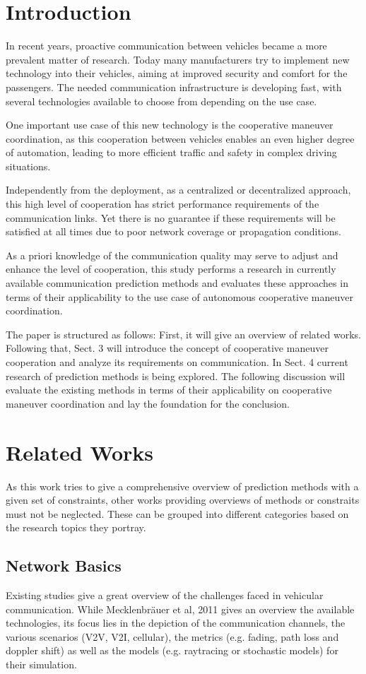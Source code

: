 \documentclass[conference]{IEEEtran}
\begin{document}
\section{Introduction}
\label{sec:introduction}
In recent years, proactive communication between vehicles became a more prevalent matter of research. Today many manufacturers try to implement new technology into their vehicles, aiming at  improved security and comfort for the passengers. The needed communication infrastructure is developing fast, with several technologies available to choose from depending on the use case.

One important use case of this new technology is the cooperative maneuver coordination, as this cooperation between vehicles enables an even higher degree of automation, leading to more efficient traffic and safety in complex driving situations.

Independently from the deployment, as a centralized or decentralized approach, this high level of cooperation has strict performance requirements of the communication links. Yet there is no guarantee if these requirements will be satisfied at all times due to poor network coverage or propagation conditions.

As a priori knowledge of the communication quality may serve to adjust and enhance the level of cooperation, this study performs a research in currently available communication prediction methods and evaluates these approaches in terms of their applicability to the use case of autonomous cooperative maneuver coordination.

The paper is structured as follows: First, it will give an overview of related works. Following that, Sect. 3 will introduce the concept of cooperative maneuver cooperation and analyze its requirements on communication. In Sect. 4 current research of prediction methods is being explored. The following discussion will evaluate the existing methods in terms of their applicability on cooperative maneuver coordination and lay the foundation for the conclusion.


\section[]{Related Works}
As this work tries to give a comprehensive overview of prediction methods with a given set of constraints, other works providing overviews of methods or constraits must not be neglected. These can be grouped into different categories based on the research topics they portray.
\subsection{Network Basics}
Existing studies give a great overview of the challenges faced in vehicular communication. While Mecklenbräuer et al, 2011 gives an overview the available technologies, its focus lies in the depiction of the communication channels, the various scenarios (V2V, V2I, cellular), the metrics (e.g. fading, path loss and doppler shift) as well as the models (e.g. raytracing or stochastic models) for their simulation.
\end{document}
